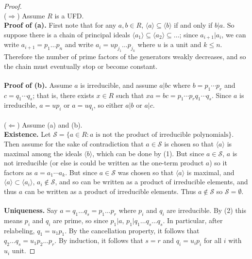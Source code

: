 \documentclass{article}
\newcommand{\set}[1]{\{ #1 \}}
\newcommand{\ang}[1]{\langle #1 \rangle}
\begin{document}
\begin{proof} $ $ \\
  ($\Longrightarrow$) Assume $R$ is a UFD.\\
  \textbf{Proof of (a).} First note that for any $a, b\in R$,
  $\ang a \subseteq \ang b$ if and only if $b | a$. So suppose there is a chain
  of principal ideals $\ang{a_1} \subseteq \ang{a_2} \subseteq \hdots$;
  since $a_{i+1} | a_i$, we can write $a_{i+1} = p_1\hdots p_n$ and write
  $a_i = up_{j_1}\hdots p_{j_k}$ where $u$ is a unit and $k \leq n$. Therefore
  the number of prime factors of the generators weakly decreases, and so the
  chain must eventually stop or become constant.
  \\~\\
  \textbf{Proof of (b).} Assume $a$ is irreducible, and assume $a|bc$ where
  $b = p_1\cdots p_r$ and $c = q_1 \cdots q_s$; that is, there exists $x \in R$
  such that $x a = bc = p_1\cdots p_r q_1 \cdots q_s$. Since $a$ is irreducible,
  $a = up_i$ or $a = u q_i$, so either $a|b$ or $a|c$.
  \\~\\
  ($\Longleftarrow$) Assume (a) and (b).\\
  \textbf{Existence.}
  Let $\mathcal S = \set{a \in R : a \text{ is not the product of irreducible polynomials}}$.
  Then assume for the sake of contradiction that $a \in \mathcal S$ is chosen
  so that $\ang a$ is maximal among the ideals $\ang b$, which can be done by
  (1). But since $a \in \mathcal S$, $a$ is not irreducible
  (or else is could be written as the one-term product $a$) so it factors as
  $a = a_1\cdots a_k$. But since $a \in \mathcal S$ was chosen so that $\ang a$
  is maximal, and $\ang a \subset \ang{a_i}$, $a_i \not\in \mathcal S$, and so
  can be written as a product of irreducible elements, and thus $a$ can be
  written as a product of irreducible elements. Thus $a \not\in \mathcal S$ so
  $\mathcal S = \emptyset$.
  \\~\\
  \textbf{Uniqueness.}
  Say $a = q_1 \hdots q_s = p_1 \hdots p_r$ where $p_i$ and $q_i$ are
  irreducible. By (2) this means $p_i$ and $q_i$ are prime, so since $p_1 | a$,
  $p_1 | q_1 \hdots q_s \hdots q_s$. In particular, after relabeling,
  $q_1 = u_1p_1$. By the cancellation property, it follows that
  $q_2 \hdots q_s = u_1p_2 \hdots p_r$. By induction, it follows that $s=r$ and
  $q_i = u_ip_i$ for all $i$ with $u_i$ unit.
\end{proof}
\end{document}
